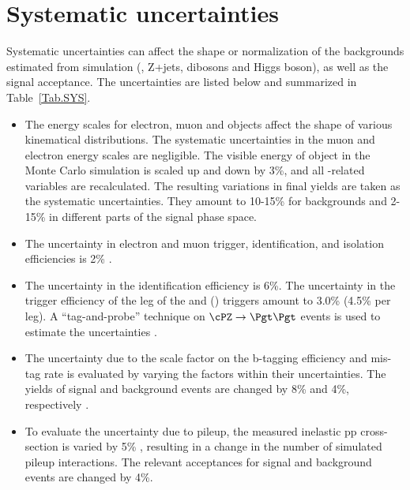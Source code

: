 \section{Systematic uncertainties}
\label{sect:sys}
Systematic uncertainties can affect the shape or normalization of the
backgrounds estimated from simulation (\ttbar, Z+jets, dibosons and Higgs boson), 
as well as the signal acceptance. 
The uncertainties are listed below and summarized in Table~\ref{Tab.SYS}.


\begin{itemize}

\item  The energy scales for electron, muon and \Tau objects affect the shape of various kinematical distributions.
 The systematic uncertainties in the muon and electron energy scales are negligible.
The visible energy of \Tau object in the Monte Carlo simulation is scaled up and down
by 3\%, and all \Tau-related variables are recalculated. The resulting variations in
final yields are taken as the systematic uncertainties. They amount to 10-15\% for 
backgrounds and 2-15\% in different parts of the signal phase space.


\item The uncertainty in electron and muon trigger, identification, and
  isolation efficiencies is 2\% \cite{Khachatryan:2014wca}.

\item The uncertainty in the \Tau identification efficiency is 6\%. 
  The uncertainty in the trigger efficiency of the \Tau leg of the \eTau and
  \muTau (\tauTau) triggers amount to 3.0\% (4.5\% per leg).
  A ``tag-and-probe'' technique on $\cPZ\to \Pgt\Pgt$ events is used to estimate the 
  uncertainties \cite{Khachatryan:2014wca}.

\item The uncertainty due to the scale factor on the b-tagging
efficiency and mis-tag rate is evaluated by varying the 
factors within their uncertainties. The yields of signal and background events are changed by 8\% 
and 4\%, respectively \cite{Chatrchyan:2012jua}.
 
\item To evaluate the uncertainty due to pileup, the measured inelastic pp cross-section is
  varied by 5\% \cite{Antchev:2011vs}, resulting in a change in the number of simulated pileup interactions.
 The relevant acceptances for signal and background events are changed by 4\%.


\end{itemize}

